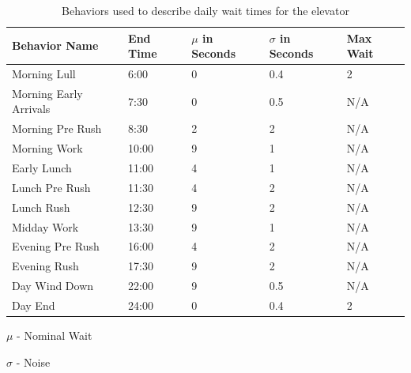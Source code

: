   \begin{table}[!htb]
    \begin{tabular}{|l|l|l|l|l|}
      \hline
      Behavior Name          & End Time & $\mu$ in Seconds & $\sigma$ in Seconds & Max Wait \\ \hline
      Morning Lull           & 6:00     & 0                                 & 0.4                           & 2        \\ \hline
      Morning Early Arrivals & 7:30     & 0                                 & 0.5                           & N/A      \\ \hline
      Morning Pre Rush       & 8:30     & 2                                 & 2                             & N/A      \\ \hline
      Morning Work           & 10:00    & 9                                 & 1                             & N/A      \\ \hline
      Early Lunch            & 11:00    & 4                                 & 1                             & N/A      \\ \hline
      Lunch Pre Rush         & 11:30    & 4                                 & 2                             & N/A      \\ \hline
      Lunch Rush             & 12:30    & 9                                 & 2                             & N/A      \\ \hline
      Midday Work            & 13:30    & 9                                 & 1                             & N/A      \\ \hline
      Evening Pre Rush       & 16:00    & 4                                 & 2                             & N/A      \\ \hline
      Evening Rush           & 17:30    & 9                                 & 2                             & N/A      \\ \hline
      Day Wind Down          & 22:00    & 9                                 & 0.5                           & N/A      \\ \hline
      Day End                & 24:00    & 0                                 & 0.4                           & 2        \\ \hline
    \end{tabular}
    \begin{tablenotes}
      \small
      \item $\mu$ - Nominal Wait
      \item $\sigma$ - Noise
    \end{tablenotes}
    \caption{Behaviors used to describe daily wait times for the elevator}
    \label{table:elevator_day_t}
  \end{table}


